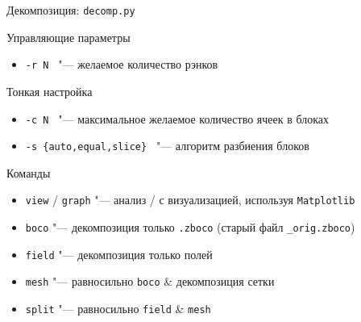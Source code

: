 \documentclass[xcolor={svgnames,table,hyperref},9pt]{beamer}
\newcommand*{\code}[1]{\texttt{\small #1}}
\begin{document}
\begin{frame}[fragile]{Декомпозиция: \texttt{decomp.py}}

  \begin{block}{Управляющие параметры}\begin{itemize}
    \item \code{-r N } "--- желаемое количество рэнков
  \end{itemize}\end{block}

  \begin{block}{Тонкая настройка}\begin{itemize}
    \item \code{-с N } "--- максимальное желаемое количество ячеек в блоках
    \item \code{-s \{auto,equal,slice\} } "--- алгоритм разбиения блоков
  \end{itemize}\end{block}

  \begin{block}{Команды}\begin{itemize}
    \item \code{view} / \code{graph} "--- анализ / с визуализацией, используя \code{Matplotlib}
    \item \code{boco} "--- декомпозиция только \code{*.zboco} (старый файл \code{*\_orig.zboco})
    \item \code{field} "--- декомпозиция только полей
    \item \code{mesh} "--- равносильно \code{boco} \& декомпозиция сетки
    \item \code{split} "--- равносильно \code{field} \& \code{mesh}
  \end{itemize}\end{block}
\end{frame}
\end{document}
